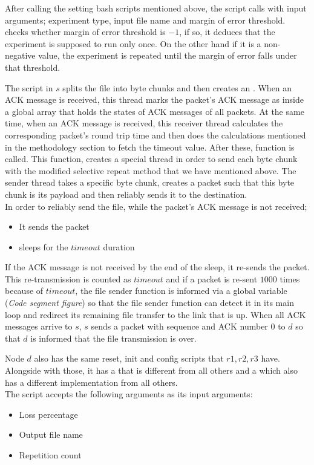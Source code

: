 \documentclass[conference]{IEEEtran}
\begin{document}
    
    After calling the setting bash scripts mentioned above, the  script calls  with input arguments; experiment type, input file name and margin of error threshold.  checks whether margin of error threshold is $-1$, if so, it deduces that the experiment is supposed to run only once. On the other hand if it is a non-negative value, the experiment is repeated until the margin of error falls under that threshold.
    
    The script  in $s$ splits the file into byte chunks and then creates an . When an ACK message is received, this thread marks the packet's ACK message as  inside a global array that holds the states of ACK messages of all packets. At the same time, when an ACK message is received, this receiver thread calculates the corresponding packet's round trip time and then does the calculations mentioned in the methodology section to fetch the timeout value. After these,  function is called. This function, creates a special  thread in order to send each byte chunk with the modified selective repeat method that we have mentioned above. The sender thread takes a specific byte chunk, creates a packet such that this byte chunk is its payload and then reliably sends it to the destination.\\ In order to reliably send the file, while the packet's ACK message is not received; 
    \begin{itemize}
        \item It sends the packet
        \item sleeps for the $timeout$ duration
    \end{itemize}
    
    If the ACK message is not received by the end of the sleep, it re-sends the packet. This re-transmission is counted as $timeout$ and if a packet is re-sent $1000$ times because of $timeout$, the file sender function is informed via a global variable (\textit{Code segment figure}) so that the file sender function can detect it in its main loop and redirect its remaining file transfer to the link that is up. When all ACK messages arrive to $s$, $s$ sends a packet with sequence and ACK number $0$ to $d$ so that $d$ is informed that the file transmission is over.
    
    Node $d$ also has the same reset, init and config scripts that $r1,r2,r3$ have. Alongside with those, it has a  that is different from all others and a  which also has a different implementation from all others. \\
    The script  accepts the following arguments as its input arguments: 
        \begin{itemize}
            \item Loss percentage
            \item Output file name
            \item Repetition count
        \end{itemize}
    
\end{document}
